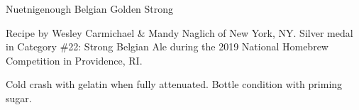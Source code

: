 \stylesection{\stylebelgiangoldenstrongale}

\begin{recipe}{Nuetnigenough Belgian Golden Strong}

\begin{aboutblock}
Recipe by Wesley Carmichael \& Mandy Naglich of New York, NY. Silver medal in
Category \#22: Strong Belgian Ale during the 2019 National Homebrew Competition
in Providence, RI. \sourceaha
\end{aboutblock}


\begin{methodandtiming}
 
\begin{mashsteps}
\end{mashsteps}

\begin{fermentationsteps}
\end{fermentationsteps}

\begin{directions}
Cold crash with gelatin when fully attenuated. Bottle condition with priming
sugar.
\end{directions}

\end{methodandtiming}

\recipebreak

\begin{ingredientsblock}

\begin{malts}
\end{malts}

\begin{hops}
\end{hops}


\end{ingredientsblock}

\end{recipe}

